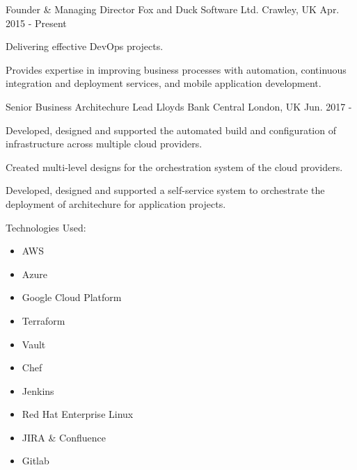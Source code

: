 

\begin{cventries}

    \cventry
    {Founder \& Managing Director} %
    {Fox and Duck Software Ltd.} %
    {Crawley, UK} %
    {Apr. 2015 - Present} %
    {
        \begin{cvitems} %
            \item {Delivering effective DevOps projects.}
            \item {Provides expertise in improving business processes with automation, continuous integration and deployment services, and mobile application development.}
        \end{cvitems}
    }

    \cventry
    {Senior Business Architechure Lead}
    {Lloyds Bank}
    {Central London, UK}
    {Jun. 2017 - }
    {
        \begin{cvitems}
            \item {Developed, designed and supported the automated build and configuration of infrastructure across multiple cloud providers.}
            \item {Created multi-level designs for the orchestration system of the cloud providers.}
            \item {Developed, designed and supported a self-service system to orchestrate the deployment of architechure for application projects.}
            \item {Technologies Used: }
            \begin{itemize}
                \item {AWS}
                \item {Azure}
                \item {Google Cloud Platform}
                \item {Terraform}
                \item {Vault}
                \item {Chef}
                \item {Jenkins}
                \item {Red Hat Enterprise Linux}
                \item {JIRA \& Confluence}
                \item {Gitlab}
            \end{itemize}
        \end{cvitems}
    }


\end{cventries}

